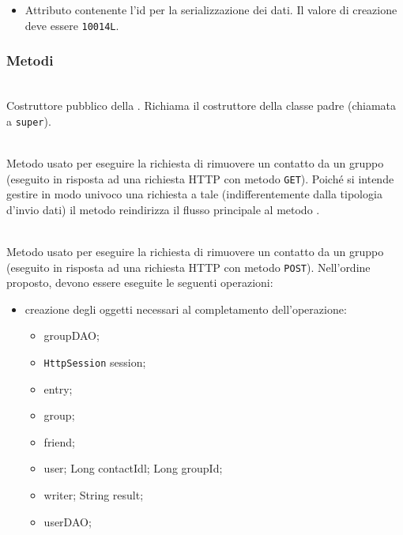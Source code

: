\begin{itemize}
	\item{}
	Attributo contenente l'id per la serializzazione dei dati. Il valore di creazione deve essere \texttt{10014L}.
\end{itemize}

\subsubsection*{Metodi}

\begin{description}
	\item{}\\
	Costruttore pubblico della . Richiama il costruttore della classe padre (chiamata a \texttt{super}).
	
	\item{}\\
	Metodo usato per eseguire la richiesta di rimuovere un contatto da un gruppo (eseguito in risposta ad una richiesta HTTP con metodo \texttt{GET}). Poiché si intende gestire in modo univoco una richiesta a tale  (indifferentemente dalla tipologia d'invio dati) il metodo reindirizza il flusso principale al metodo .
	
	\item{}\\	
	Metodo usato per eseguire la richiesta di rimuovere un contatto da un gruppo (eseguito in risposta ad una richiesta HTTP con metodo \texttt{POST}). Nell'ordine proposto, devono essere eseguite le seguenti operazioni:
	\begin{itemize}
		\item creazione degli oggetti necessari al completamento dell'operazione:
		\begin{itemize}
			\item {} groupDAO;
			\item \texttt{HttpSession} session;
			\item {} entry;
			\item {} group;
			\item {} friend;
			\item {} user;
			Long contactIdl;
			Long groupId;
			\item {} writer;
			String result;
			\item {} userDAO;
		\end{itemize}
		

\end{itemize}
\end{description}
